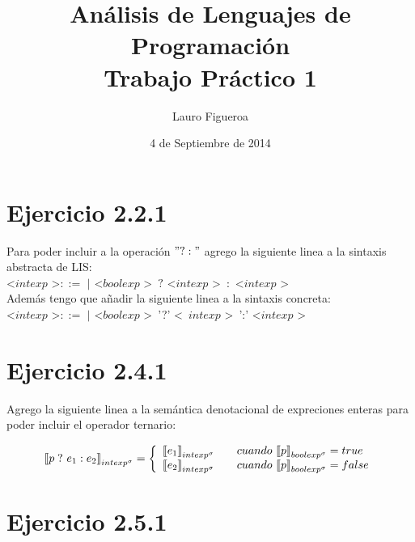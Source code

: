 \documentclass[a4paper,12pt]{article}
\begin{document}
\title{Análisis de Lenguajes de Programación\\ 
        Trabajo Práctico 1}
\author{Lauro Figueroa}
\date{4 de Septiembre de 2014}
\maketitle
\newpage


\section{Ejercicio 2.2.1}
Para poder incluir a la operación $"?:"$ agrego la siguiente linea a la sintaxis abstracta de LIS:\\

\textless $intexp$ \textgreater $::=$ \quad $|$ \textless $boolexp$ \textgreater\ $?$ \textless $intexp$ \textgreater\ $:$ \textless $intexp$ \textgreater \\

Además tengo que añadir la siguiente linea a la sintaxis concreta:\\

\textless $intexp$ \textgreater $::=$ \quad $|$ \textless $boolexp$ \textgreater\ '?' \textless\ $intexp$ \textgreater\ ':' \textless $intexp$ \textgreater


\section{Ejercicio 2.4.1}

Agrego la siguiente linea a la semántica denotacional de expreciones enteras para poder incluir el
operador ternario:

\[
|[{p\; ?\ e_1 : e_2}|]_{intexp^{\sigma }} = 
\left\{
  \begin{array}{l l}
    |[e_1|]_{intexp^{\sigma }} & \quad cuando \ |[p|]_{boolexp^{\sigma }} = true\\
    |[e_2|]_{intexp^{\sigma }} & \quad cuando \ |[p|]_{boolexp^{\sigma }} = false\\
  \end{array} 
\right.
\]

\section{Ejercicio 2.5.1}
\end{document}
